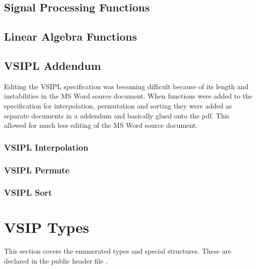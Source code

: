\subsection*{Signal Processing Functions}
    
    
    
    
    
    
\subsection*{Linear Algebra Functions}
    
    
    
\subsection*{VSIPL Addendum}
Editing the VSIPL specification was becoming difficult because of its length and instabilities in the MS Word source document. When functions were added to the specification for interpolation, permutation and sorting they were added as separate documents in a addendum and basically glued onto the pdf. This allowed for much less editing of the MS Word source document.
\subsubsection*{VSIPL Interpolation}
\subsubsection*{VSIPL Permute}
\subsubsection*{VSIPL Sort}
%
\section*{VSIP Types}
This section covers the enumerated types and special structures. These are declared in the public header file .
%

